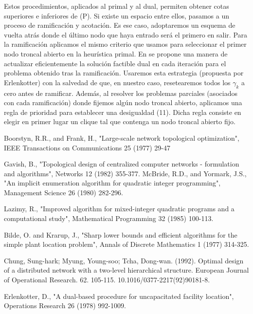 \documentclass[twoside,12pt]{article}
\begin{document}
Estos procedimientos, aplicados al primal y al dual, permiten obtener cotas superiores e inferiores de (P). Si existe un espacio entre ellos, pasamos a un proceso de ramificación y acotación. Es ese caso, adoptaremos un esquema de vuelta atrás donde el último nodo que haya entrado será el primero en salir. Para la ramificación aplicamos el mismo criterio que usamos para seleccionar el primer nodo troncal abierto en la heurística primal. En \cite{Erlen} se propone una manera de actualizar eficientemente la solución factible dual en cada iteración para el problema obtenido tras la ramificación. Usaremos esta estrategia (propuesta por Erlenkotter) con la salvedad de que, en nuestro caso, resetearemos todos los $\gamma_{k}$ a cero antes de ramificar. Además, al resolver los problemas parciales (asociados con cada ramificación) donde fijemos algún nodo troncal abierto, aplicamos una regla de prioridad para establecer una desigualdad (11). Dicha regla consiste en elegir en primer lugar un clique tal que contenga un nodo troncal abierto fijo.\\
\newpage
\begin{thebibliography}{9}
Boorstyn, R.R., and Frank, H., "Large-scale network
topological optimization", IEEE Transactions on Communications
25 (1977) 29-47

Gavish, B., "Topological design of centralized computer
networks - formulation and algorithms", Networks 12
(1982) 355-377. 
McBride, R.D., and Yormark, J.S., "An implicit enumeration algorithm for quadratic integer programming", Management Science 26 (1980) 282-296.

Lazimy, R., "Improved algorithm for mixed-integer quadratic programs and a computational study", Mathematical Programming 32 (1985) 100-113.

Bilde, O. and Krarup, J., "Sharp lower bounds and
efficient algorithms for the simple plant location problem",
Annals of Discrete Mathematics 1 (1977) 314-325.

Chung, Sung-hark; Myung, Young-soo; Tcha, Dong-wan. (1992). Optimal design of a distributed network with a two-level hierarchical structure. European Journal of Operational Research. 62. 105-115. 10.1016/0377-2217(92)90181-8. 

Erlenkotter, D., "A dual-based procedure for uncapacitated
facility location", Operations Research 26 (1978)
992-1009.
\end{thebibliography} 
\end{document}
